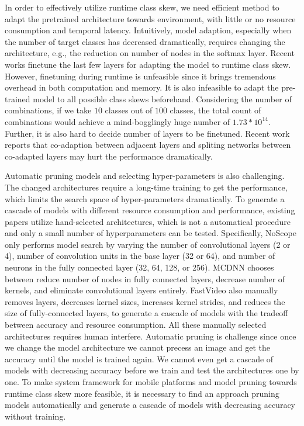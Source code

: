 \documentclass[pageno]{jpaper}
\begin{document}
In order to effectively utilize runtime class skew, we need efficient method to adapt the pretrained architecture towards environment, with little or no resource consumption and temporal latency. Intuitively, model adaption, especially when the number of target classes has decreased dramatically, requires changing the architecture, e.g., the reduction on number of nodes in the softmax layer. Recent works finetune the last few layers for adapting the model to runtime class skew. However, finetuning during runtime is unfeasible since it brings tremendous overhead in both computation and memory. It is also infeasible to adapt the pre-trained model to all possible class skews beforehand. Considering the number of combinations, if we take $10$ classes out of $100$ classes, the total count of combinations would achieve a mind-bogglingly huge number of $1.73*10^{14}$. Further, it is also hard to decide number of layers to be finetuned. Recent work \cite{yosinski2014transferable} reports that co-adaption between adjacent layers and spliting networks between co-adapted layers may hurt the performance dramatically. 

Automatic pruning models and selecting hyper-parameters is also challenging. The changed architectures require a long-time training to get the performance, which limits the search space of hyper-parameters dramatically. To generate a cascade of models with different resource consumption and performance, existing papers utilize hand-selected architectures, which is not a automatical procedure and only a small number of hyperparameters can be tested. Specifically, NoScope \cite{kang2017noscope} only performs model search by varying the number of convolutional layers (2 or 4), number of convolution units in the base layer (32 or 64), and number of neurons in the fully connected layer (32, 64, 128, or 256). MCDNN \cite{han2016mcdnn} chooses between reduce number of nodes in fully connected layers, decrease number of kernels, and eliminate convolutional layers entirely. FastVideo \cite{shen2016fast} also manually removes layers, decreases kernel sizes, increases kernel strides, and reduces the size of fully-connected layers, to generate a cascade of models with the tradeoff between accuracy and resource consumption. All these manually selected architectures requires human interfere. Automatic pruning is challenge since once we change the model architecture we cannot precess an image and get the accuracy until the model is trained again. We cannot even get a cascade of models with decreasing accuracy before we train and test the architectures one by one. To make system framework for mobile platforms and model pruning towards runtime class skew more feasible, it is necessary to find an approach pruning models automatically and generate a cascade of models with decreasing accuracy without training.
\end{document}
